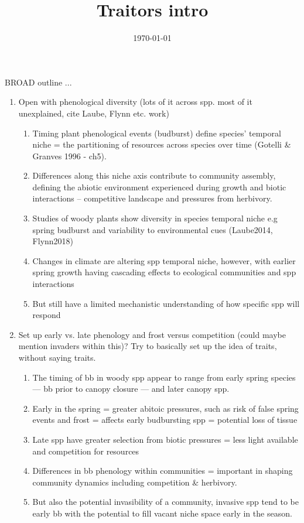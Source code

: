 \documentclass{article}
\begin{document}
\title{Traitors intro}
\date{\today}

\maketitle 

BROAD outline ...

\begin{enumerate}

\item Open with phenological diversity (lots of it across spp. most of it unexplained, cite Laube, Flynn etc. work)

\begin{enumerate}
\item Timing plant phenological events (budburst) define species' temporal niche = the partitioning of resources across species over time (Gotelli \& Granves 1996 - ch5).
\item Differences along this niche axis contribute to community assembly, defining the abiotic environment experienced during growth and biotic interactions -- competitive landscape and pressures from herbivory.
\item Studies of woody plants show diversity in species temporal niche e.g spring budburst and variability to environmental cues (Laube2014, Flynn2018)
\item Changes in climate are altering spp temporal niche, however, with earlier spring growth having cascading effects to ecological communities and spp interactions
\item But still have a limited mechanistic understanding of how specific spp will respond
\end{enumerate}

\item Set up early vs. late phenology and frost versus competition (could maybe mention invaders within this)? Try to basically set up the idea of traits, without saying traits.
\begin{enumerate}
\item The timing of bb in woody spp appear to range from early spring species — bb prior to canopy closure — and later canopy spp. 
\item Early in the spring = greater abitoic pressures, such as risk of false spring events and frost = affects early budbursting spp = potential loss of tissue
\item Late spp have greater selection from biotic pressures = less light available and competition for resources 
\item Differences in bb phenology within communities = important in shaping community dynamics including competition \& herbivory. 
\item But also the potential invasibility of a community, invasive spp tend to be early bb with the potential to fill vacant niche space early in the season. 
\end{enumerate}


\end{enumerate}
\end{document}
